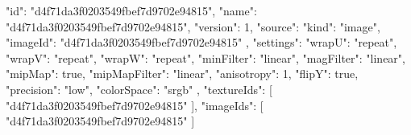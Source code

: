{
  "id": "d4f71da3f0203549fbef7d9702e94815",
  "name": "d4f71da3f0203549fbef7d9702e94815",
  "version": 1,
  "source": {
    "kind": "image",
    "imageId": "d4f71da3f0203549fbef7d9702e94815"
  },
  "settings": {
    "wrapU": "repeat",
    "wrapV": "repeat",
    "wrapW": "repeat",
    "minFilter": "linear",
    "magFilter": "linear",
    "mipMap": true,
    "mipMapFilter": "linear",
    "anisotropy": 1,
    "flipY": true,
    "precision": "low",
    "colorSpace": "srgb"
  },
  "textureIds": [
    "d4f71da3f0203549fbef7d9702e94815"
  ],
  "imageIds": [
    "d4f71da3f0203549fbef7d9702e94815"
  ]
}
